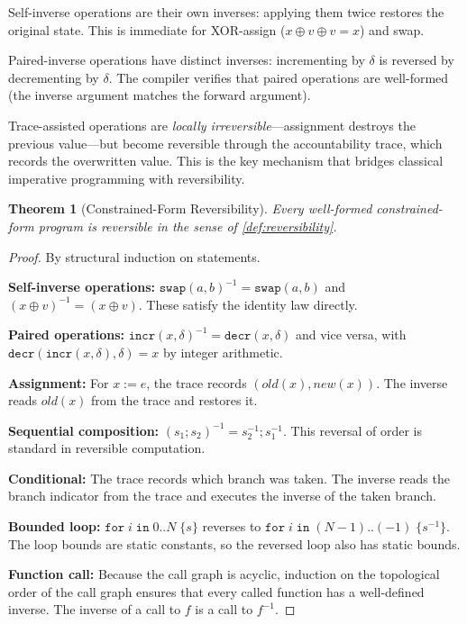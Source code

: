 \documentclass[11pt,a4paper]{article}
\newtheorem{theorem}{Theorem}[section]
\newcommand{\inv}[1]{#1^{-1}}
\begin{document}
Self-inverse operations are their own inverses: applying them twice restores
the original state.  This is immediate for XOR-assign ($x \oplus v \oplus v
= x$) and swap.

Paired-inverse operations have distinct inverses: incrementing by $\delta$ is
reversed by decrementing by $\delta$.  The compiler verifies that paired
operations are well-formed (the inverse argument matches the forward
argument).

Trace-assisted operations are \emph{locally irreversible}---assignment
destroys the previous value---but become reversible through the
accountability trace, which records the overwritten value.  This is the key
mechanism that bridges classical imperative programming with reversibility.

\begin{theorem}[Constrained-Form Reversibility]
\label{thm:reversibility}
Every well-formed constrained-form program is reversible in the sense of
\cref{def:reversibility}.
\end{theorem}

\begin{proof}
By structural induction on statements.

\textbf{Self-inverse operations:}  $\inv{\texttt{swap}(a,b)} =
\texttt{swap}(a,b)$ and $\inv{(x \oplus v)} = (x \oplus v)$.  These satisfy
the identity law directly.

\textbf{Paired operations:}  $\inv{\texttt{incr}(x, \delta)} =
\texttt{decr}(x, \delta)$ and vice versa, with
$\texttt{decr}(\texttt{incr}(x, \delta), \delta) = x$ by integer arithmetic.

\textbf{Assignment:}  For $x := e$, the trace records $(\textit{old}(x),
\textit{new}(x))$.  The inverse reads $\textit{old}(x)$ from the trace and
restores it.

\textbf{Sequential composition:}  $\inv{(s_1; s_2)} = \inv{s_2}; \inv{s_1}$.
This reversal of order is standard in reversible computation.

\textbf{Conditional:}  The trace records which branch was taken.  The inverse
reads the branch indicator from the trace and executes the inverse of the
taken branch.

\textbf{Bounded loop:}  $\texttt{for}\;i\;\texttt{in}\;0\texttt{..}N\;\{s\}$
reverses to $\texttt{for}\;i\;\texttt{in}\;(N{-}1)\texttt{..}(-1)\;\{\inv{s}\}$.
The loop bounds are static constants, so the reversed loop also has static
bounds.

\textbf{Function call:}  Because the call graph is acyclic, induction on the
topological order of the call graph ensures that every called function has a
well-defined inverse.  The inverse of a call to $f$ is a call to $\inv{f}$.
\end{proof}
\end{document}
